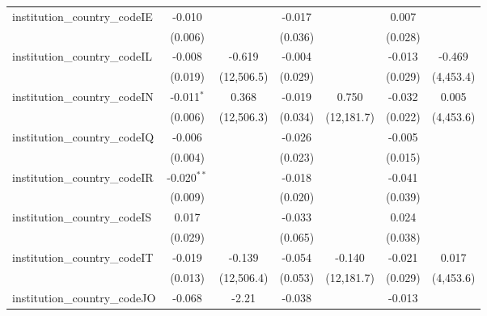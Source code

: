 \begin{tabular}{lcccccc}
   institution\_country\_codeIE          & -0.010         &               & -0.017        &               & 0.007         &   \\   
                                         & (0.006)        &               & (0.036)       &               & (0.028)       &   \\   
   institution\_country\_codeIL          & -0.008         & -0.619        & -0.004        &               & -0.013        & -0.469\\   
                                         & (0.019)        & (12,506.5)    & (0.029)       &               & (0.029)       & (4,453.4)\\   
   institution\_country\_codeIN          & -0.011$^{*}$   & 0.368         & -0.019        & 0.750         & -0.032        & 0.005\\   
                                         & (0.006)        & (12,506.3)    & (0.034)       & (12,181.7)    & (0.022)       & (4,453.6)\\   
   institution\_country\_codeIQ          & -0.006         &               & -0.026        &               & -0.005        &   \\   
                                         & (0.004)        &               & (0.023)       &               & (0.015)       &   \\   
   institution\_country\_codeIR          & -0.020$^{**}$  &               & -0.018        &               & -0.041        &   \\   
                                         & (0.009)        &               & (0.020)       &               & (0.039)       &   \\   
   institution\_country\_codeIS          & 0.017          &               & -0.033        &               & 0.024         &   \\   
                                         & (0.029)        &               & (0.065)       &               & (0.038)       &   \\   
   institution\_country\_codeIT          & -0.019         & -0.139        & -0.054        & -0.140        & -0.021        & 0.017\\   
                                         & (0.013)        & (12,506.4)    & (0.053)       & (12,181.7)    & (0.029)       & (4,453.6)\\   
   institution\_country\_codeJO          & -0.068         & -2.21         & -0.038        &               & -0.013        &   \\   

\end{tabular}
